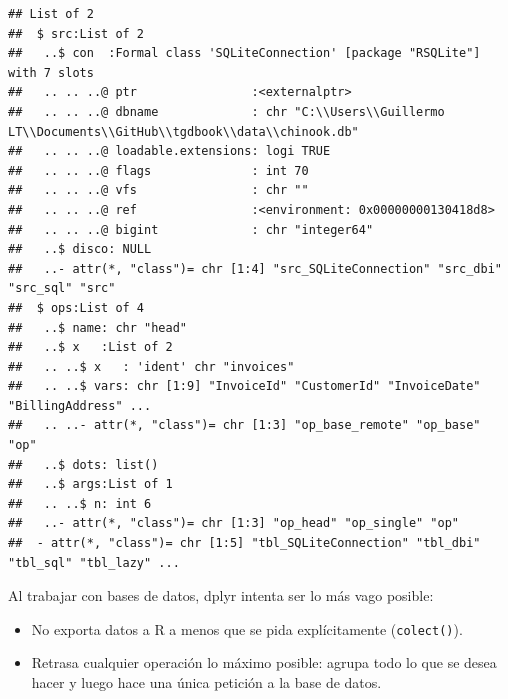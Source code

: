 \documentclass[]{book}
\newenvironment{Shaded}{\begin{snugshade}}{\end{snugshade}}
\newcommand{\NormalTok}[1]{#1}
\newcommand{\OperatorTok}[1]{\textcolor[rgb]{0.81,0.36,0.00}{\textbf{#1}}}
\newcommand{\StringTok}[1]{\textcolor[rgb]{0.31,0.60,0.02}{#1}}
\begin{document}
\begin{verbatim}
## List of 2
##  $ src:List of 2
##   ..$ con  :Formal class 'SQLiteConnection' [package "RSQLite"] with 7 slots
##   .. .. ..@ ptr                :<externalptr> 
##   .. .. ..@ dbname             : chr "C:\\Users\\Guillermo LT\\Documents\\GitHub\\tgdbook\\data\\chinook.db"
##   .. .. ..@ loadable.extensions: logi TRUE
##   .. .. ..@ flags              : int 70
##   .. .. ..@ vfs                : chr ""
##   .. .. ..@ ref                :<environment: 0x00000000130418d8> 
##   .. .. ..@ bigint             : chr "integer64"
##   ..$ disco: NULL
##   ..- attr(*, "class")= chr [1:4] "src_SQLiteConnection" "src_dbi" "src_sql" "src"
##  $ ops:List of 4
##   ..$ name: chr "head"
##   ..$ x   :List of 2
##   .. ..$ x   : 'ident' chr "invoices"
##   .. ..$ vars: chr [1:9] "InvoiceId" "CustomerId" "InvoiceDate" "BillingAddress" ...
##   .. ..- attr(*, "class")= chr [1:3] "op_base_remote" "op_base" "op"
##   ..$ dots: list()
##   ..$ args:List of 1
##   .. ..$ n: int 6
##   ..- attr(*, "class")= chr [1:3] "op_head" "op_single" "op"
##  - attr(*, "class")= chr [1:5] "tbl_SQLiteConnection" "tbl_dbi" "tbl_sql" "tbl_lazy" ...
\end{verbatim}

Al trabajar con bases de datos, dplyr intenta ser lo más vago posible:

\begin{itemize}
\item
  No exporta datos a R a menos que se pida explícitamente (\texttt{colect()}).
\item
  Retrasa cualquier operación lo máximo posible:
  agrupa todo lo que se desea hacer y luego hace una única petición a la base de datos.
\end{itemize}

\begin{Shaded}
\end{Shaded}
\end{document}
